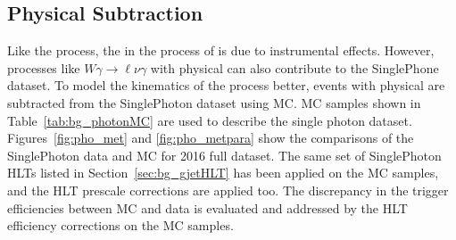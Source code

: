 \subsection{Physical \boldmath{\ptmiss} Subtraction}\label{sec:bg_gjetphysmet}
Like the \Zjets process, the \ptmiss in the process of \gjets is due to instrumental effects. However, processes like $W\gamma\rightarrow\ell\nu\gamma$ with physical \ptmiss can also contribute to the SinglePhone dataset. To model the kinematics of the \gjets process better, events with physical \ptmiss are subtracted from the SinglePhoton dataset using MC. MC samples shown in Table~\ref{tab:bg_photonMC} are used to describe the single photon dataset. Figures~\ref{fig:pho_met} and \ref{fig:pho_metpara} show the comparisons of the SinglePhoton data and MC for 2016 full dataset. The same set of SinglePhoton HLTs listed in Section~\ref{sec:bg_gjetHLT} has been applied on the MC samples, and the HLT prescale corrections are applied too. The discrepancy in the trigger efficiencies between MC and data is evaluated and addressed by the HLT efficiency corrections on the MC samples.

